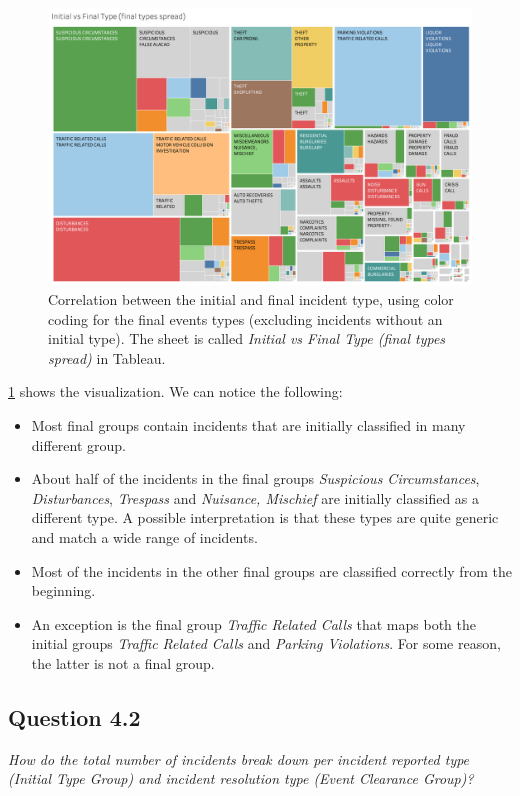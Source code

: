 \begin{figure}[h]
	\centering
	\includegraphics[width=\columnwidth]{figures/4_1_initial_vs_final_group_spread_treemap}
	\caption{Correlation between the initial and final incident type, using color coding for the final events types (excluding incidents without an initial type). The sheet is called \textit{Initial vs Final Type (final types spread)} in Tableau.}
	\label{fig:4_1_initial_vs_final_group_spread_treemap}
\end{figure}

\cref{fig:4_1_initial_vs_final_group_spread_treemap} shows the visualization.
We can notice the following:
\begin{itemize}
	\item Most final groups contain incidents that are initially classified in many different group.
	\item About half of the incidents in the final groups \textit{Suspicious Circumstances}, \textit{Disturbances}, \textit{Trespass} and \textit{Nuisance, Mischief} are initially classified as a different type. A possible interpretation is that these types are quite generic and match a wide range of incidents.
	\item Most of the incidents in the other final groups are classified correctly from the beginning.
	\item An exception is the final group \textit{Traffic Related Calls} that maps both the initial groups \textit{Traffic Related Calls} and \textit{Parking Violations}. For some reason, the latter is not a final group.
\end{itemize}

\subsection*{Question 4.2}
\textit{How do the total number of incidents break down per incident reported type (Initial Type Group) and incident resolution type (Event Clearance Group)?}


